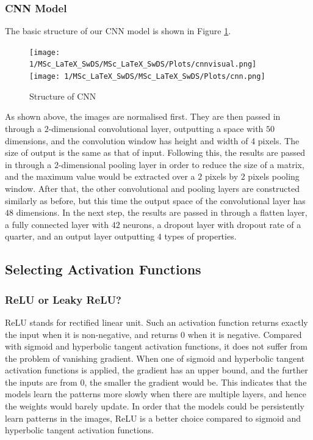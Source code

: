 \documentclass[11pt,twoside]{article}
\numberwithin{Theorem}{section}
\numberwithin{Definition}{section}
\numberwithin{Lemma}{section}
\numberwithin{Algorithm}{section}
\numberwithin{equation}{section}
\begin{document}
\subsubsection{CNN Model}
The basic structure of our CNN model is shown in Figure \ref{fig:cnn}.

\begin{figure}[h]
\centering
\texttt{[image: 1/MSc\_LaTeX\_SwDS/MSc\_LaTeX\_SwDS/Plots/cnnvisual.png]}
\texttt{[image: 1/MSc\_LaTeX\_SwDS/MSc\_LaTeX\_SwDS/Plots/cnn.png]}
\caption{Structure of CNN}
\label{fig:cnn}
\end{figure}

As shown above, the images are normalised first. They are then passed in through a $2$-dimensional convolutional layer, outputting a space with $50$ dimensions, and the convolution window has height and width of 4 pixels. The size of output is the same as that of input. Following this, the results are passed in through a $2$-dimensional pooling layer in order to reduce the size of a matrix, and the maximum value would be extracted over a $2$ pixels by $2$ pixels pooling window. After that, the other convolutional and pooling layers are constructed similarly as before, but this time the output space of the convolutional layer has $48$ dimensions. In the next step, the results are passed in through a flatten layer, a fully connected layer with $42$ neurons, a dropout layer with dropout rate of a quarter, and an output layer outputting $4$ types of properties.

\subsection{Selecting Activation Functions}
\subsubsection{ReLU or Leaky ReLU?}
ReLU stands for rectified linear unit. Such an activation function returns exactly the input when it is non-negative, and returns $0$ when it is negative. Compared with sigmoid and hyperbolic tangent activation functions, it does not suffer from the problem of vanishing gradient. When one of sigmoid and hyperbolic tangent activation functions is applied, the gradient has an upper bound, and the further the inputs are from $0$, the smaller the gradient would be. This indicates that the models learn the patterns more slowly when there are multiple layers, and hence the weights would barely update. In order that the models could be persistently learn patterns in the images, ReLU is a better choice compared to sigmoid and hyperbolic tangent activation functions.
\end{document}
